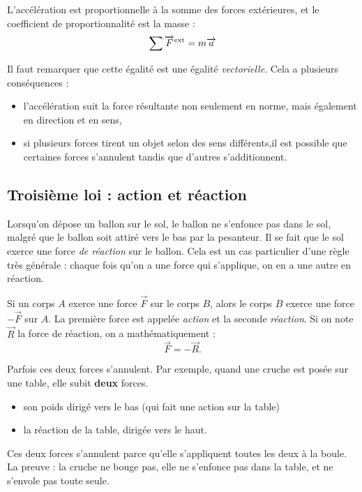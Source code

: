 \begin{loiphyz}
L'accélération est proportionnelle à la somme des forces extérieures, et le coefficient de proportionnalité est la masse :
\begin{equation}
  \sum\overrightarrow{F}^{\mathrm{ext}}=m\overrightarrow{a}
\end{equation}
\end{loiphyz}
Il faut remarquer que cette égalité est une égalité \emph{vectorielle}. Cela a plusieurs conséquences :
\begin{itemize}
\item l'accélération suit la force résultante non seulement en norme, mais également en direction et en sens,
\item si plusieurs forces tirent un objet selon des sens différents,il est possible que certaines forces s'annulent tandis que d'autres s'additionnent.
\end{itemize}

\subsection{Troisième loi : action et réaction}

Lorsqu'on dépose un ballon sur le sol, le ballon ne s'enfonce pas dans le sol, malgré que le ballon soit attiré vers le bas par la pesanteur. Il se fait que le sol exerce une force \emph{de réaction} sur le ballon. Cela est un cas particulier d'une règle très générale : chaque fois qu'on a une force qui s'applique, on en a une autre en réaction.

\begin{loiphyz}
Si un corps $A$ exerce une force $\overrightarrow{F}$ sur le corps $B$, alors le corps $B$ exerce une force $-\overrightarrow{F}$ sur $A$. La première force est appelée \emph{action} et la seconde \emph{réaction}. Si on note $\overrightarrow{R}$ la force de réaction, on a mathématiquement :
\begin{equation}   \label{EqActReact}
  \overrightarrow{F}=-\overrightarrow{R}.
\end{equation}

\end{loiphyz}


\begin{exemple}
Parfois ces deux forces s'annulent. Par exemple, quand une cruche est posée sur une table, elle subit {\bf deux} forces.
\begin{itemize}
\item son poids dirigé vers le bas (qui fait une action sur la table)
\item la réaction de la table, dirigée vers le haut.
\end{itemize}
Ces deux forces s'annulent parce qu'elle s'appliquent toutes les deux à la boule. La preuve : la cruche ne bouge pas, elle ne s'enfonce pas dans la table, et ne s'envole pas toute seule.
\end{exemple}

